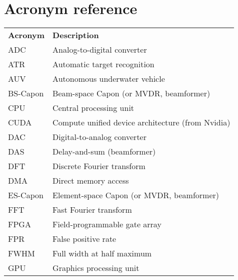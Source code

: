 \chapter*{Acronym reference}

\begin{longtable}{l l}
	\textbf{Acronym} & \textbf{Description}                                                      \\
	ADC              & Analog-to-digital converter                                               \\
	ATR              & Automatic target recognition                                              \\
	AUV              & Autonomous underwater vehicle                                             \\
	BS-Capon         & Beam-space Capon (or MVDR, beamformer)                                    \\
	CPU              & Central processing unit                                                   \\
	CUDA             & Compute unified device architecture (from Nvidia)                         \\
	DAC              & Digital-to-analog converter                                               \\
	DAS              & Delay-and-sum (beamformer)                                                \\
	DFT              & Discrete Fourier transform                                                \\
	DMA              & Direct memory access                                                      \\
	ES-Capon         & Element-space Capon (or MVDR, beamformer)                                 \\
	FFT              & Fast Fourier transform                                                    \\
	FPGA             & Field-programmable gate array                                             \\
	FPR              & False positive rate                                                       \\
	FWHM             & Full width at half maximum                                                \\
	GPU              & Graphics processing unit                                                  \\

\end{longtable}
